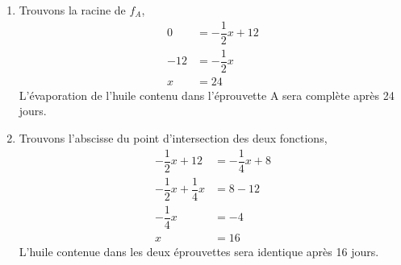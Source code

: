     \begin{enumerate}
        \item Trouvons la racine de $f_A$,
              \begin{align*}
                  0   & =-\dfrac{1}{2}x+12 \\
                  -12 & = -\dfrac{1}{2}x   \\
                  x   & = 24
              \end{align*}
              L'évaporation de l'huile contenu dans l'éprouvette A sera complète après 24 jours.
        \item Trouvons l'abscisse du point d'intersection des deux fonctions,
              \begin{align*}
                  -\dfrac{1}{2}x+12              & = -\dfrac{1}{4}x+8 \\
                  -\dfrac{1}{2}x + \dfrac{1}{4}x & = 8 -12            \\
                  -\dfrac{1}{4}x                 & = -4               \\
                  x                              & = 16
              \end{align*}
              L'huile contenue dans les deux éprouvettes sera identique après 16 jours.
    \end{enumerate}
